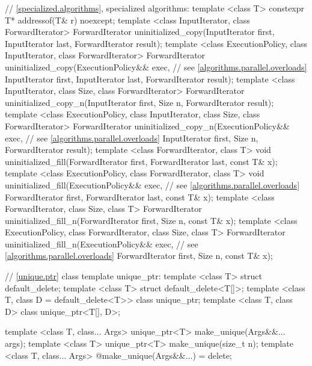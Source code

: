 \begin{codeblock}
{  // \ref{specialized.algorithms}, specialized algorithms:
  template <class T> constexpr T* addressof(T& r) noexcept;
  template <class InputIterator, class ForwardIterator>
    ForwardIterator uninitialized_copy(InputIterator first, InputIterator last,
                                       ForwardIterator result);
  template <class ExecutionPolicy, class InputIterator, class ForwardIterator>
    ForwardIterator uninitialized_copy(ExecutionPolicy&& exec, // see \ref{algorithms.parallel.overloads}
                                       InputIterator first, InputIterator last,
                                       ForwardIterator result);
  template <class InputIterator, class Size, class ForwardIterator>
    ForwardIterator uninitialized_copy_n(InputIterator first, Size n,
                                         ForwardIterator result);
  template <class ExecutionPolicy, class InputIterator, class Size, class ForwardIterator>
    ForwardIterator uninitialized_copy_n(ExecutionPolicy&& exec, // see \ref{algorithms.parallel.overloads}
                                         InputIterator first, Size n,
                                         ForwardIterator result);
  template <class ForwardIterator, class T>
    void uninitialized_fill(ForwardIterator first, ForwardIterator last,
                            const T& x);
  template <class ExecutionPolicy, class ForwardIterator, class T>
    void uninitialized_fill(ExecutionPolicy&& exec, // see \ref{algorithms.parallel.overloads}
                            ForwardIterator first, ForwardIterator last,
                            const T& x);
  template <class ForwardIterator, class Size, class T>
    ForwardIterator uninitialized_fill_n(ForwardIterator first, Size n, const T& x);
  template <class ExecutionPolicy, class ForwardIterator, class Size, class T>
    ForwardIterator uninitialized_fill_n(ExecutionPolicy&& exec, // see \ref{algorithms.parallel.overloads}
                                         ForwardIterator first, Size n, const T& x);

  // \ref{unique.ptr} class template unique_ptr:
  template <class T> struct default_delete;
  template <class T> struct default_delete<T[]>;
  template <class T, class D = default_delete<T>> class unique_ptr;
  template <class T, class D> class unique_ptr<T[], D>;

  template <class T, class... Args> unique_ptr<T> make_unique(Args&&... args);
  template <class T> unique_ptr<T> make_unique(size_t n);
  template <class T, class... Args> @\unspec@ make_unique(Args&&...) = delete;

}
\end{codeblock}
